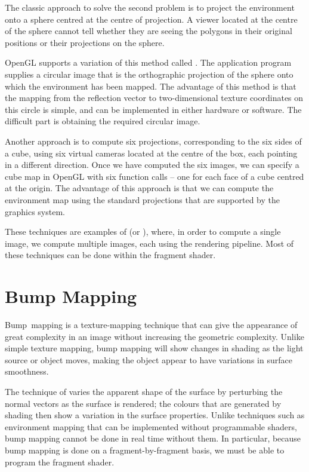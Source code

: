 \documentclass[../COS3712_Notes.tex]{subfiles}
\begin{document}
      The classic approach to solve the second problem is to project the environment
      onto a sphere centred at the centre of projection.
      A viewer located at the centre of the sphere cannot tell whether they are seeing the
      polygons in their original positions or their projections on the sphere.

      OpenGL supports a variation of this method called .
      The application program supplies a circular image that is the orthographic projection
      of the sphere onto which the environment has been mapped.
      The advantage of this method is that the mapping from the reflection vector to
      two-dimensional texture coordinates on this circle is simple, and can be implemented
      in either hardware or software.
      The difficult part is obtaining the required circular image.

      Another approach is to compute six projections, corresponding to the six sides of a cube,
      using six virtual cameras located at the centre of the box, each pointing in a different
      direction.
      Once we have computed the six images, we can specify a cube map in OpenGL with six function
      calls -- one for each face of a cube centred at the origin.
      The advantage of this approach is that we can compute the environment map using the
      standard projections that are supported by the graphics system.

      These techniques are examples of  (or ),
      where, in order to compute a single image, we compute multiple images, each using the
      rendering pipeline.
      Most of these techniques can be done within the fragment shader.

    \section{Bump Mapping}
      Bump~mapping is a texture-mapping technique that can give the appearance
      of great complexity in an image without increasing the geometric complexity.
      Unlike simple texture mapping, bump mapping will show changes in shading as the light
      source or object moves, making the object appear to have variations in
      surface smoothness.

      The technique of  varies the apparent shape of the surface
      by perturbing the normal vectors as the surface is rendered;
      the colours that are generated by shading then show a variation in the surface properties.
      Unlike techniques such as environment mapping that can be implemented without
      programmable shaders, bump mapping cannot be done in real time without them.
      In particular, because bump mapping is done on a fragment-by-fragment basis,
      we must be able to program the fragment shader.
\end{document}

